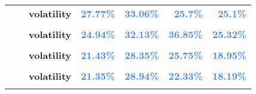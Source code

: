 \documentclass[
  authoryear,
  preprint,
  3p]{elsarticle}
\begin{document}
\begin{longtable}[t]{>{}l>{}l>{}l>{}r>{}r>{}r>{}r}
\addlinespace
\textbf{} & \textbf{} & \textbf{volatility} & \textcolor[HTML]{4285f4}{\textbf{27.77\%}} & \textcolor[HTML]{4285f4}{\textbf{33.06\%}} & \textcolor[HTML]{4285f4}{\textbf{25.7\%}} & \textcolor[HTML]{4285f4}{\textbf{25.1\%}}\\
\textbf{\cellcolor{gray!10}{}} & \textbf{\cellcolor{gray!10}{contango}} & \textbf{\cellcolor{gray!10}{mean}} & \textcolor[HTML]{4285f4}{\textbf{\cellcolor{gray!10}{1.52\%}}} & \textcolor[HTML]{4285f4}{\textbf{\cellcolor{gray!10}{15.91\%}}} & \textcolor[HTML]{4285f4}{\textbf{\cellcolor{gray!10}{2.32\%}}} & \textcolor[HTML]{4285f4}{\textbf{\cellcolor{gray!10}{2.22\%}}}\\
\textbf{} & \textbf{} & \textbf{volatility} & \textcolor[HTML]{4285f4}{\textbf{24.94\%}} & \textcolor[HTML]{4285f4}{\textbf{32.13\%}} & \textcolor[HTML]{4285f4}{\textbf{36.85\%}} & \textcolor[HTML]{4285f4}{\textbf{25.32\%}}\\
\textbf{\cellcolor{gray!10}{Soybean oil (XCBT)}} & \textbf{\cellcolor{gray!10}{whole period}} & \textbf{\cellcolor{gray!10}{mean}} & \textcolor[HTML]{4285f4}{\textbf{\cellcolor{gray!10}{6.21\%}}} & \textcolor[HTML]{4285f4}{\textbf{\cellcolor{gray!10}{15.57\%}}} & \textcolor[HTML]{4285f4}{\textbf{\cellcolor{gray!10}{4.04\%}}} & \textcolor[HTML]{4285f4}{\textbf{\cellcolor{gray!10}{-7.39\%}}}\\
\textbf{} & \textbf{} & \textbf{volatility} & \textcolor[HTML]{4285f4}{\textbf{21.43\%}} & \textcolor[HTML]{4285f4}{\textbf{28.35\%}} & \textcolor[HTML]{4285f4}{\textbf{25.75\%}} & \textcolor[HTML]{4285f4}{\textbf{18.95\%}}\\
\addlinespace
\textbf{\cellcolor{gray!10}{}} & \textbf{\cellcolor{gray!10}{backwardation}} & \textbf{\cellcolor{gray!10}{mean}} & \textcolor[HTML]{4285f4}{\textbf{\cellcolor{gray!10}{14.79\%}}} & \textcolor[HTML]{4285f4}{\textbf{\cellcolor{gray!10}{14.62\%}}} & \textcolor[HTML]{4285f4}{\textbf{\cellcolor{gray!10}{20.34\%}}} & \textcolor[HTML]{4285f4}{\textbf{\cellcolor{gray!10}{-9.44\%}}}\\
\textbf{} & \textbf{} & \textbf{volatility} & \textcolor[HTML]{4285f4}{\textbf{21.35\%}} & \textcolor[HTML]{4285f4}{\textbf{28.94\%}} & \textcolor[HTML]{4285f4}{\textbf{22.33\%}} & \textcolor[HTML]{4285f4}{\textbf{18.19\%}}\\
\textbf{\cellcolor{gray!10}{}} & \textbf{\cellcolor{gray!10}{contango}} & \textbf{\cellcolor{gray!10}{mean}} & \textcolor[HTML]{4285f4}{\textbf{\cellcolor{gray!10}{-2.68\%}}} & \textcolor[HTML]{4285f4}{\textbf{\cellcolor{gray!10}{16.62\%}}} & \textcolor[HTML]{4285f4}{\textbf{\cellcolor{gray!10}{-10.01\%}}} & \textcolor[HTML]{4285f4}{\textbf{\cellcolor{gray!10}{-4.12\%}}}\\

\end{longtable}
\end{document}
